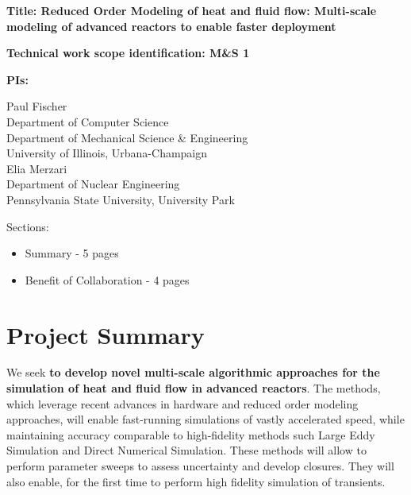\parindent 0in
\parskip 0.1in

{\bf Title:  Reduced Order Modeling of heat and fluid flow: Multi-scale modeling of advanced reactors to enable faster deployment }

{\bf Technical work scope identification: M\&S 1 }

{\bf PIs:}

Paul Fischer \\
Department of Computer Science \\
Department of Mechanical Science \& Engineering \\
University of Illinois, Urbana-Champaign \\

Elia Merzari \\
Department of Nuclear Engineering \\
Pennsylvania State University, University Park

Sections:
\begin{itemize}
\item{Summary - 5 pages}
\item{Benefit of Collaboration - 4 pages}
\end{itemize}



\section{Project Summary}


We seek \textbf{to develop novel multi-scale algorithmic approaches for the
simulation of heat and fluid flow in advanced reactors}. The methods, which
leverage recent advances in hardware and reduced order modeling approaches,
will enable fast-running simulations of vastly accelerated speed, while
maintaining accuracy comparable to high-fidelity methods such Large Eddy
Simulation and Direct Numerical Simulation. These methods will allow to perform
parameter sweeps to assess uncertainty and develop closures. They will also
enable, for the first time to perform high fidelity simulation of transients.

